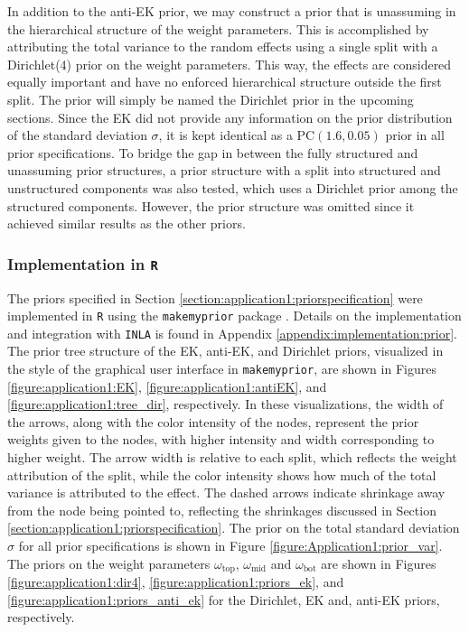 In addition to the anti-EK prior, we may construct a prior that is unassuming in the hierarchical structure of the weight parameters. This is accomplished by attributing the total variance to the random effects using a single split with a Dirichlet(4) prior on the weight parameters. This way, the effects are considered equally important and have no enforced hierarchical structure outside the first split. The prior will simply be named the Dirichlet prior in the upcoming sections. Since the EK did not provide any information on the prior distribution of the standard deviation $\sigma$, it is kept identical as a $\text{PC}(1.6, 0.05)$ prior in all prior specifications. To bridge the gap in between the fully structured and unassuming prior structures, a prior structure with a split into structured and unstructured components was also tested, which uses a Dirichlet prior among the structured components. However, the prior structure was omitted since it achieved similar results as the other priors.

\subsubsection{Implementation in \texttt{R}}
\label{section:application1:prior-mmp}
The priors specified in Section \ref{section:application1:priorspecification} were implemented in \texttt{R} using the \texttt{makemyprior} package \citep{MMPPackage, MMP}. Details on the implementation and integration with \texttt{INLA} is found in Appendix \ref{appendix:implementation:prior}. The prior tree structure of the EK, anti-EK, and Dirichlet priors, visualized in the style of the graphical user interface in \texttt{makemyprior}, are shown in Figures \ref{figure:application1:EK}, \ref{figure:application1:antiEK}, and \ref{figure:application1:tree_dir}, respectively. In these visualizations, the width of the arrows, along with the color intensity of the nodes, represent the prior weights given to the nodes, with higher intensity and width corresponding to higher weight. The arrow width is relative to each split, which reflects the weight attribution of the split, while the color intensity shows how much of the total variance is attributed to the effect. The dashed arrows indicate shrinkage away from the node being pointed to, reflecting the shrinkages discussed in Section \ref{section:application1:priorspecification}. The prior on the total standard deviation $\sigma$ for all prior specifications is shown in Figure \ref{figure:Application1:prior_var}. The priors on the weight parameters $\omega_{\text{top}}$, $\omega_{\text{mid}}$ and $\omega_{\text{bot}}$ are shown in Figures \ref{figure:application1:dir4}, \ref{figure:application1:priors_ek}, and  \ref{figure:application1:priors_anti_ek} for the Dirichlet, EK and, anti-EK priors, respectively. 

